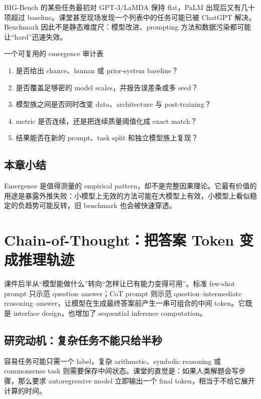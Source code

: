 \documentclass[a4paper]{article}
\begin{document}
BIG-Bench 的某些任务最初对 GPT-3/LaMDA 保持 flat，PaLM 出现后又有几十项超过 baseline。课堂甚至现场发现一个列表中的任务可能已被 ChatGPT 解决。Benchmark 因此不是静态难度尺：模型改进、prompting 方法和数据污染都可能让“hard”迅速失效。

\begin{importantbox}{一个可复用的 emergence 审计表}
\begin{enumerate}
  \item 是否给出 chance、human 或 prior-system baseline？
  \item 是否覆盖足够密的 model scales，并报告误差条或多 seed？
  \item 模型族之间是否同时改变 data、architecture 与 post-training？
  \item metric 是否连续，还是把连续质量阈值化成 exact match？
  \item 结果能否在新的 prompt、task split 和独立模型族上复现？
\end{enumerate}
\end{importantbox}

\subsection{本章小结}

Emergence 是值得测量的 empirical pattern，却不是完整因果理论。它最有价值的用途是暴露外推失败：小模型上无效的方法可能在大模型上有效，小模型上看似稳定的负趋势可能反转，旧 benchmark 也会被快速穿透。

\section{Chain-of-Thought：把答案 Token 变成推理轨迹}

课件后半从“模型能做什么”转向“怎样让已有能力变得可用”。标准 few-shot prompt 只示范 question--answer；CoT prompt 则示范 question--intermediate reasoning--answer，让模型在生成最终答案前产生一串可组合的中间 token。它既是 interface design，也增加了 sequential inference computation。

\subsection{研究动机：复杂任务不能只给半秒}

容易任务可能只需一个 label，复杂 arithmetic、symbolic reasoning 或 commonsense task 则需要保存中间状态。课堂的直觉是：如果人类解题会写步骤，那么要求 autoregressive model 立即输出一个 final token，相当于不给它展开计算的时间。
\end{document}
